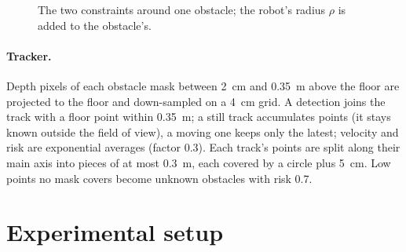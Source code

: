 \documentclass[10pt,a4paper]{article}
\begin{document}
\begin{figure}[htbp]
\centering
{}
\caption{The two constraints around one obstacle; the robot's radius $\rho$ is added to the obstacle's.}
\label{fig:constraints}
\end{figure}

\paragraph{Tracker.} Depth pixels of each obstacle mask between 2~cm and 0.35~m above the floor are projected to the floor and
down-sampled on a 4~cm grid. A detection joins the track with a floor point within 0.35~m; a still track accumulates points (it stays
known outside the field of view), a moving one keeps only the latest; velocity and risk are exponential averages (factor 0.3).
Each track's points are split along their main axis into pieces of at most 0.3~m, each covered by a circle plus 5~cm. Low points no
mask covers become unknown obstacles with risk 0.7.

\section{Experimental setup}\label{sec:setup}
\end{document}

